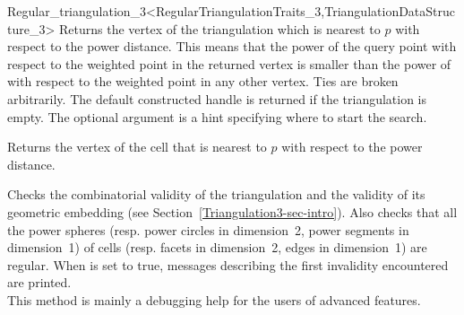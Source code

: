 \begin{ccRefClass}{Regular_triangulation_3<RegularTriangulationTraits_3,TriangulationDataStructure_3>}
{Returns the vertex of the triangulation which is nearest to $p$
with respect to the power distance. This  means that the power
of the  query point  with respect to the weighted point in
the returned vertex is smaller than the power of 
 with respect to the weighted point
in any other vertex. Ties are broken arbitrarily.
The default constructed
handle is returned if the triangulation is empty. 
The optional argument  is a hint
specifying where to start the search.
} 


{Returns the vertex of the cell  
that is nearest to $p$
with respect to the power distance.
}

\begin{ccAdvanced}
{Checks the combinatorial validity of the triangulation and the
validity of its geometric embedding (see
Section~\ref{Triangulation3-sec-intro}). Also checks that all the
power spheres (resp. power circles in dimension~2, power segments in
dimension~1) of cells (resp. facets in dimension~2, edges in
dimension~1) are regular. When 
is set to true, messages describing the first invalidity encountered
are printed.\\ This method is mainly a debugging help for the users of
advanced features.
}

\end{ccAdvanced}




\end{ccRefClass}
